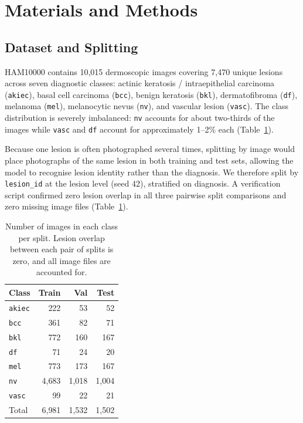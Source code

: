 \documentclass[conference]{IEEEtran}
\begin{document}
\section{Materials and Methods}

\subsection{Dataset and Splitting}
HAM10000 \cite{tschandl2018} contains 10{,}015 dermoscopic images covering
7{,}470 unique lesions across seven diagnostic classes: actinic keratosis /
intraepithelial carcinoma (\texttt{akiec}), basal cell carcinoma
(\texttt{bcc}), benign keratosis (\texttt{bkl}), dermatofibroma
(\texttt{df}), melanoma (\texttt{mel}), melanocytic nevus (\texttt{nv}), and
vascular lesion (\texttt{vasc}). The class distribution is severely
imbalanced: \texttt{nv} accounts for about two-thirds of the images while
\texttt{vasc} and \texttt{df} account for approximately 1--2\% each (Table~\ref{tab:split}).

Because one lesion is often photographed several times, splitting by image
would place photographs of the same lesion in both training and
test sets, allowing the model to recognise lesion identity rather than the
diagnosis. We therefore split by \texttt{lesion\_id} at the lesion level
(seed 42), stratified on diagnosis. A verification script
confirmed zero lesion overlap in all three pairwise split comparisons
and zero missing image files (Table~\ref{tab:split}).

\begin{table}[t]
\caption{Number of images in each class per split. Lesion overlap between
each pair of splits is zero, and all image files are accounted for.}
\label{tab:split}
\centering
\small
\begin{tabular}{lrrr}
\toprule
Class & Train & Val & Test \\
\midrule
\texttt{akiec} & 222 & 53 & 52 \\
\texttt{bcc}   & 361 & 82 & 71 \\
\texttt{bkl}   & 772 & 160 & 167 \\
\texttt{df}    & 71  & 24 & 20 \\
\texttt{mel}   & 773 & 173 & 167 \\
\texttt{nv}    & 4{,}683 & 1{,}018 & 1{,}004 \\
\texttt{vasc}  & 99  & 22 & 21 \\
\midrule
Total & 6{,}981 & 1{,}532 & 1{,}502 \\
\bottomrule
\end{tabular}
\end{table}
\end{document}
